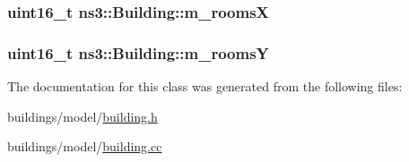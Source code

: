 \subsubsection[{\texorpdfstring{m\+\_\+roomsX}{m_roomsX}}]{\setlength{\rightskip}{0pt plus 5cm}uint16\+\_\+t ns3\+::\+Building\+::m\+\_\+roomsX\hspace{0.3cm}{\ttfamily [private]}}\hypertarget{classns3_1_1Building_aadefd6e202170cfe4088ca978fa04464}{}\label{classns3_1_1Building_aadefd6e202170cfe4088ca978fa04464}
\subsubsection[{\texorpdfstring{m\+\_\+roomsY}{m_roomsY}}]{\setlength{\rightskip}{0pt plus 5cm}uint16\+\_\+t ns3\+::\+Building\+::m\+\_\+roomsY\hspace{0.3cm}{\ttfamily [private]}}\hypertarget{classns3_1_1Building_ac754f0013fd5d8dd69de871ada562f2a}{}\label{classns3_1_1Building_ac754f0013fd5d8dd69de871ada562f2a}


The documentation for this class was generated from the following files\+:\begin{DoxyCompactItemize}
\item 
buildings/model/\hyperlink{building_8h}{building.\+h}\item 
buildings/model/\hyperlink{building_8cc}{building.\+cc}\end{DoxyCompactItemize}
